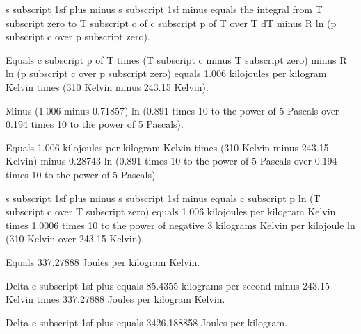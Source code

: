 s subscript 1sf plus minus s subscript 1sf minus equals the integral from T subscript zero to T subscript c of c subscript p of T over T dT minus R ln (p subscript c over p subscript zero).

Equals c subscript p of T times (T subscript c minus T subscript zero) minus R ln (p subscript c over p subscript zero) equals 1.006 kilojoules per kilogram Kelvin times (310 Kelvin minus 243.15 Kelvin).

Minus (1.006 minus 0.71857) ln (0.891 times 10 to the power of 5 Pascals over 0.194 times 10 to the power of 5 Pascals).

Equals 1.006 kilojoules per kilogram Kelvin times (310 Kelvin minus 243.15 Kelvin) minus 0.28743 ln (0.891 times 10 to the power of 5 Pascals over 0.194 times 10 to the power of 5 Pascals).

s subscript 1sf plus minus s subscript 1sf minus equals c subscript p ln (T subscript c over T subscript zero) equals 1.006 kilojoules per kilogram Kelvin times 1.0006 times 10 to the power of negative 3 kilograms Kelvin per kilojoule ln (310 Kelvin over 243.15 Kelvin).

Equals 337.27888 Joules per kilogram Kelvin.

Delta e subscript 1sf plus equals 85.4355 kilograms per second minus 243.15 Kelvin times 337.27888 Joules per kilogram Kelvin.

Delta e subscript 1sf plus equals 3426.188858 Joules per kilogram.
